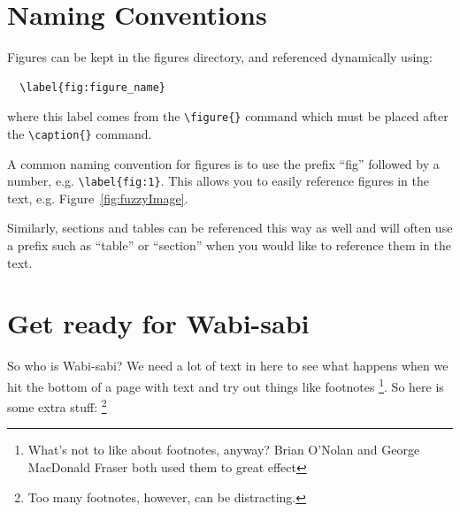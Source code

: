 \documentclass[dissertation]{bsu-cs}  %
\begin{document}
\pagebreak
\section{Naming Conventions}

Figures can be kept in the figures directory, and referenced dynamically using:

\begin{verbatim}
  \label{fig:figure_name}
\end{verbatim}

where this label comes from the \verb|\figure{}| command which must be placed after the \verb|\caption{}| command.

A common naming convention for figures is to use the prefix ``fig'' followed by a number, e.g. \verb|\label{fig:1}|.  This allows you to easily reference figures in the text, e.g. Figure~\ref{fig:fuzzyImage}.

Similarly, sections and tables can be referenced this way as well and will often use a prefix such as ``table'' or ``section'' when you would like to reference them in the text.

\section{Get ready for Wabi-sabi}\label{sec:getReady}

So who is Wabi-sabi? We need a lot of text in here to see what happens when we hit the bottom of
a page with text and try out things like footnotes
\footnote{What's not to like about footnotes, anyway?  Brian O'Nolan and George MacDonald Fraser both used them to great effect}.
So here is some extra stuff:%
\footnote{Too many footnotes, however, can be distracting.}
\end{document}
